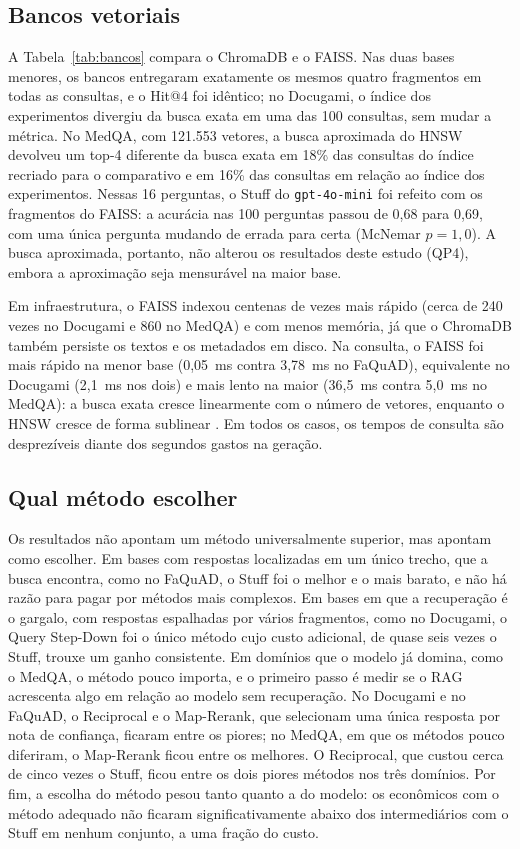 \subsection{Bancos vetoriais}
\label{ssc:bancos}

A Tabela~\ref{tab:bancos} compara o ChromaDB e o FAISS. Nas duas bases menores, os bancos entregaram exatamente os mesmos quatro fragmentos em todas as consultas, e o Hit@4 foi idêntico; no Docugami, o índice dos experimentos divergiu da busca exata em uma das 100 consultas, sem mudar a métrica. No MedQA, com 121.553 vetores, a busca aproximada do HNSW devolveu um top-4 diferente da busca exata em 18\% das consultas do índice recriado para o comparativo e em 16\% das consultas em relação ao índice dos experimentos. Nessas 16 perguntas, o Stuff do \texttt{gpt-4o-mini} foi refeito com os fragmentos do FAISS: a acurácia nas 100 perguntas passou de 0,68 para 0,69, com uma única pergunta mudando de errada para certa (McNemar $p = 1{,}0$). A busca aproximada, portanto, não alterou os resultados deste estudo (QP4), embora a aproximação seja mensurável na maior base.


Em infraestrutura, o FAISS indexou centenas de vezes mais rápido (cerca de 240 vezes no Docugami e 860 no MedQA) e com menos memória, já que o ChromaDB também persiste os textos e os metadados em disco. Na consulta, o FAISS foi mais rápido na menor base (0,05~ms contra 3,78~ms no FaQuAD), equivalente no Docugami (2,1~ms nos dois) e mais lento na maior (36,5~ms contra 5,0~ms no MedQA): a busca exata cresce linearmente com o número de vetores, enquanto o HNSW cresce de forma sublinear \cite{malkov2020hnsw}. Em todos os casos, os tempos de consulta são desprezíveis diante dos segundos gastos na geração.

\subsection{Qual método escolher}
\label{ssc:escolha}

Os resultados não apontam um método universalmente superior, mas apontam como escolher. Em bases com respostas localizadas em um único trecho, que a busca encontra, como no FaQuAD, o Stuff foi o melhor e o mais barato, e não há razão para pagar por métodos mais complexos. Em bases em que a recuperação é o gargalo, com respostas espalhadas por vários fragmentos, como no Docugami, o Query Step-Down foi o único método cujo custo adicional, de quase seis vezes o Stuff, trouxe um ganho consistente. Em domínios que o modelo já domina, como o MedQA, o método pouco importa, e o primeiro passo é medir se o RAG acrescenta algo em relação ao modelo sem recuperação. No Docugami e no FaQuAD, o Reciprocal e o Map-Rerank, que selecionam uma única resposta por nota de confiança, ficaram entre os piores; no MedQA, em que os métodos pouco diferiram, o Map-Rerank ficou entre os melhores. O Reciprocal, que custou cerca de cinco vezes o Stuff, ficou entre os dois piores métodos nos três domínios. Por fim, a escolha do método pesou tanto quanto a do modelo: os econômicos com o método adequado não ficaram significativamente abaixo dos intermediários com o Stuff em nenhum conjunto, a uma fração do custo.

